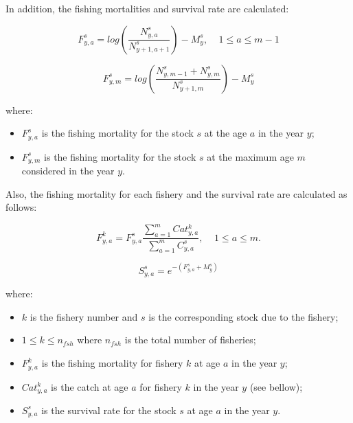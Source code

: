\documentclass{article}
\begin{document}
\hfill

In addition, the fishing mortalities and survival rate are calculated:

\begin{equation}
F^s_{y,a}=log\left(\dfrac{N^s_{y,a}}{N^s_{y+1,a+1}}\right)-M^s_y, \ \ \ \ \ 1\leq a \leq m-1
\end{equation}

\begin{equation}
F^s_{y,m}=log\left(\dfrac{N^s_{y,m-1}+N^s_{y,m}}{N^s_{y+1,m}}\right)-M^s_y
\end{equation}

where:

\begin{itemize}
    \item $F^s_{y,a}$ is the fishing mortality for the stock $s$ at the age $a$ in the year $y$;

    \item $F^s_{y,m}$ is the fishing mortality for the stock $s$ at the maximum age $m$ considered in the year $y$.
\end{itemize}

\hfill

Also, the fishing mortality for each fishery and the survival rate are calculated as follows:

\begin{equation}
F^k_{y,a}=F^s_{y,a} \dfrac{\sum_{a = 1} ^{m} Cat^k_{y,a}}{\sum_{a=1} ^{m} C^s_{y,a}}, \ \ \ \ \ 1\leq a \leq m.
\end{equation}

\begin{equation}
S^s_{y,a}=e^{-(F^s_{y,a}+M^s_{y})}
\end{equation}

where:
\begin{itemize}
    \item $k$ is the fishery number and $s$ is the corresponding stock due to the fishery;
    
    \item $1\leq k \leq n_{fsh}$ where $n_{fsh}$ is the total number of fisheries;
   
    \item $F^k_{y,a}$ is the fishing mortality for fishery $k$ at age $a$ in the year $y$;

    \item $Cat^k_{y,a}$ is the catch at age $a$ for fishery $k$ in the year $y$ (see bellow);
    
    \item $S^s_{y,a}$ is the survival rate for the stock $s$ at age $a$ in the year $y$.
\end{itemize}
\end{document}
